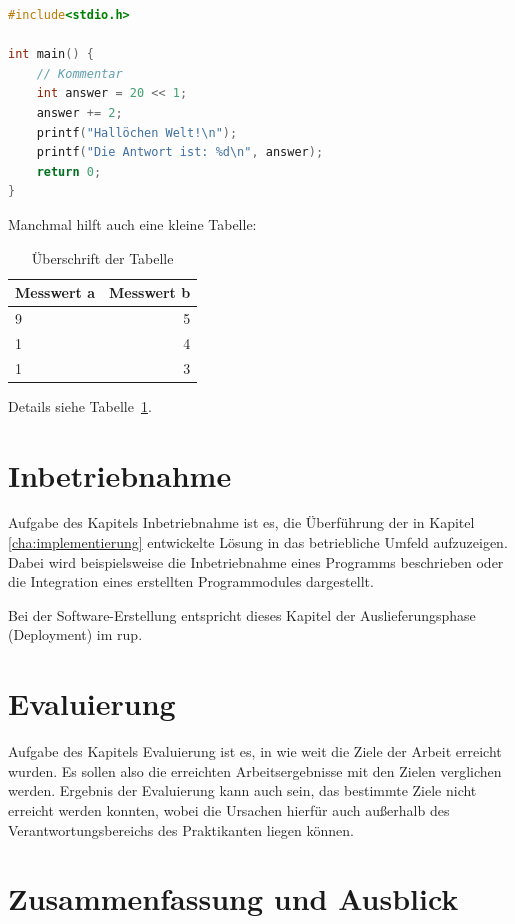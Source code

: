 \documentclass[oneside]{ausarbeitung}
\begin{document}
\begin{lstlisting}[language=c,%
                   caption={Überschrift des Quelltexts},label=lst:test]
#include<stdio.h>

int main() {
    // Kommentar
    int answer = 20 << 1;
    answer += 2;
    printf("Hallöchen Welt!\n");
    printf("Die Antwort ist: %d\n", answer);
    return 0;
}
\end{lstlisting}

Manchmal hilft auch eine kleine Tabelle:

\begin{table}[htbp]
\centering
\begin{tabular}{|l|r|}
\hline
\textbf{Messwert a} & \textbf{Messwert b} \\ \hline
9 & 5 \\ \hline
1 & 4 \\ \hline
1 & 3 \\ \hline
\end{tabular}
\caption{Überschrift der Tabelle}
\label{tab:my-table}
\end{table}

Details siehe Tabelle~\ref{tab:my-table}.
\chapter{Inbetriebnahme}
\label{cha:inbetriebnahme}

Aufgabe des Kapitels Inbetriebnahme ist es, die Überführung der in 
Kapitel \ref{cha:implementierung} entwickelte Lösung in das betriebliche 
Umfeld aufzuzeigen. Dabei wird beispielsweise die Inbetriebnahme eines 
Programms beschrieben oder die Integration eines erstellten 
Programmodules dargestellt.

Bei der Software-Erstellung entspricht dieses Kapitel der 
Auslieferungsphase (Deployment) im \ac{rup}.

\chapter{Evaluierung}

Aufgabe des Kapitels Evaluierung ist es, in wie weit die Ziele der 
Arbeit erreicht wurden. Es sollen also die erreichten Arbeitsergebnisse 
mit den Zielen verglichen werden. Ergebnis der Evaluierung kann auch 
sein, das bestimmte Ziele nicht erreicht werden konnten, wobei die 
Ursachen hierfür auch außerhalb des Verantwortungsbereichs des 
Praktikanten liegen können.

\chapter{Zusammenfassung und Ausblick}
\label{cha:zusammenfassung}
\end{document}
